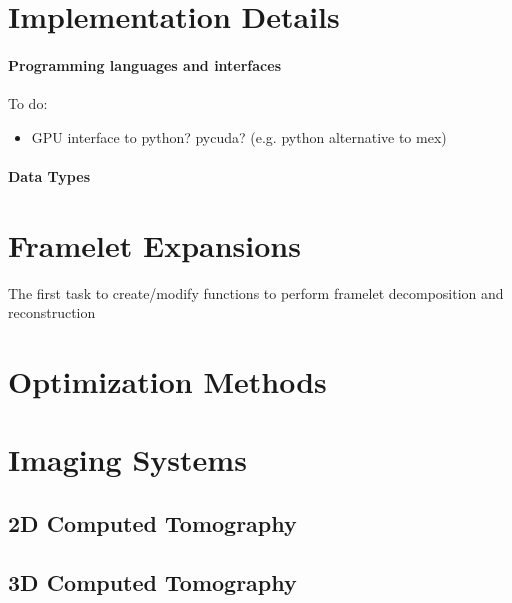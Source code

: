 \documentclass[12pt]{article}
\begin{document}
\section{Implementation Details}

\paragraph{Programming languages and interfaces}
To do: 
\begin{itemize}
\item GPU interface to python?  pycuda?  (e.g. python alternative to mex)
\end{itemize}

\paragraph{Data Types}



\section{Framelet Expansions}
The first task to create/modify functions to perform framelet decomposition and reconstruction 


\section{Optimization Methods}
%


\section{Imaging Systems}  
\subsection{2D Computed Tomography}


\subsection{3D Computed Tomography}

 
\end{document}
